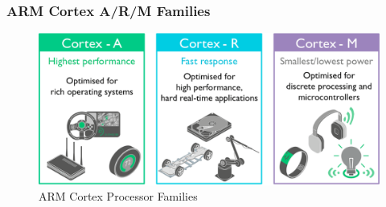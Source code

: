 \documentclass[aspectratio=169]{beamer}
\begin{document}
\begin{frame}
  \frametitle{ARM Cortex A/R/M Families}
  \begin{figure}
    \centering
    \includegraphics[scale=0.3]{images/cortex-families.png}
    \caption{ARM Cortex Processor Families}
  \end{figure}
\end{frame}
\end{document}

